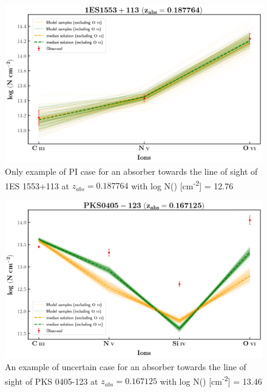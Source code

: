\begin{figure}
    \centering
    \includegraphics[width=\linewidth]{Figures/1es1553-z=0.187764-compI.png}
    \caption{Only example of PI case for an absorber towards the line of sight of 1ES 1553+113 at $z_{abs}=0.187764$ with log N() [cm\textsuperscript{-2}] = 12.76}
    \label{fig:ex-PI}
\end{figure}


\begin{figure}
    \centering
    \includegraphics[width=\linewidth]{Figures/pks0405-z=0.167125-compII.png}
    \caption{An example of uncertain case for an absorber towards the line of sight of PKS 0405-123 at $z_{abs}=0.167125$ with log N() [cm\textsuperscript{-2}] = 13.46}
    \label{fig:ex-uncertain}
\end{figure}



